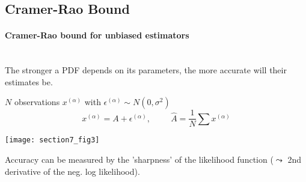 \subsection{Cramer-Rao Bound}
\paragraph{Cramer-Rao bound for unbiased estimators}\mbox{}\\
The stronger a PDF depends on its parameters, the more accurate will their estimates be.
\vspace{0.2cm}

$N$ observations $x^{(\alpha)}$ with $ \epsilon^{(\alpha)} \sim N(0,\sigma^2)$ 
$$
x^{(\alpha)} = A + \epsilon^{(\alpha)}, \hspace{1cm} \hat{A} = \frac{1}{N} \sum x^{(\alpha)} 
$$
\begin{center}
\texttt{[image: section7\_fig3]}  
\end{center}
Accuracy can be measured by the 'sharpness' of the likelihood
  function ($\leadsto$ 2nd derivative of the neg. log likelihood).


